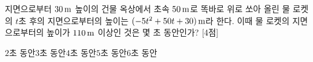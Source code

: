 지면으로부터 $30\mkern3mu \mathrm{m}$ 높이의 건물 옥상에서 초속 $50\mkern3mu \mathrm{m}$로 똑바로 위로 쏘아 올린 물 로켓의 $t$초 후의 지면으로부터의 높이는 $(-5t^2+50t+30)\mkern3mu \mathrm{m}$라 한다. 이때 물 로켓의 지면으로부터의 높이가 $110\mkern3mu \mathrm{m}$ 이상인 것은 몇 초 동안인가? \mbox{[4점]}
\begin{choices32}{$2$초 동안}{$3$초 동안}{$4$초 동안}{$5$초 동안}{$6$초 동안}\end{choices32}
